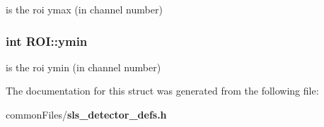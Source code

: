 is the roi ymax (in channel number) 
\subsubsection{\setlength{\rightskip}{0pt plus 5cm}int \bf{ROI::ymin}}\label{structROI_8ff93da542938e19e5116c52e9c4bb7e}


is the roi ymin (in channel number) 

The documentation for this struct was generated from the following file:\begin{CompactItemize}
\item 
common\-Files/\bf{sls\_\-detector\_\-defs.h}\end{CompactItemize}
